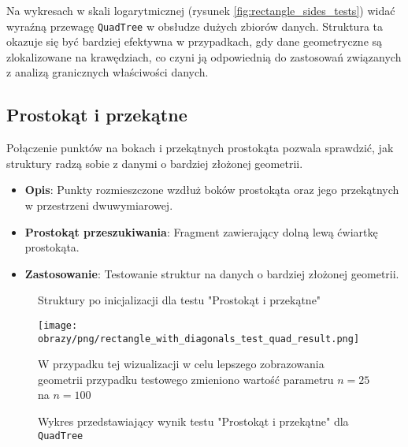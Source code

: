 \documentclass[12pt]{article}
\begin{document}
\noindent Na wykresach w skali logarytmicznej (rysunek \ref{fig:rectangle_sides_tests}) widać wyraźną przewagę \texttt{QuadTree} w obsłudze dużych zbiorów danych. Struktura ta okazuje się być bardziej efektywna w przypadkach, gdy dane geometryczne są zlokalizowane na krawędziach, co czyni ją odpowiednią do zastosowań związanych z analizą granicznych właściwości danych.

\newpage
\subsection{Prostokąt i przekątne}
Połączenie punktów na bokach i przekątnych prostokąta pozwala sprawdzić, jak struktury radzą sobie z danymi o bardziej złożonej geometrii.
\begin{itemize}
    \item \textbf{Opis}: Punkty rozmieszczone wzdłuż boków prostokąta oraz jego przekątnych w przestrzeni dwuwymiarowej.
    \item \textbf{Prostokąt przeszukiwania}: Fragment zawierający dolną lewą ćwiartkę prostokąta.
    \item \textbf{Zastosowanie}: Testowanie struktur na danych o bardziej złożonej geometrii.
\end{itemize}

\begin{figure}[h]
    \centering
    \qquad
    \caption{Struktury po inicjalizacji dla testu "Prostokąt i przekątne"}%
    \label{fig:rectangle_with_diagonals}%
\end{figure}

\begin{figure}[h]
    \centering
    \texttt{[image: obrazy/png/rectangle\_with\_diagonals\_test\_quad\_result.png]}
    \caption{Wykres przedstawiający wynik testu "Prostokąt i przekątne" dla \texttt{QuadTree}
    \\
    } 
    W przypadku tej wizualizacji w celu lepszego zobrazowania geometrii przypadku testowego zmieniono wartość parametru \( n = 25 \) na \( n = 100 \) 
    
    \label{fig:rectangle_with_diagonals_test_quad_result}
\end{figure}
\end{document}
